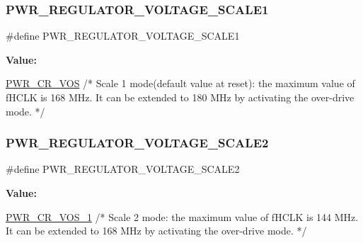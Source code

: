 \subsubsection{\texorpdfstring{P\+W\+R\+\_\+\+R\+E\+G\+U\+L\+A\+T\+O\+R\+\_\+\+V\+O\+L\+T\+A\+G\+E\+\_\+\+S\+C\+A\+L\+E1}{PWR\_REGULATOR\_VOLTAGE\_SCALE1}}
{\footnotesize\ttfamily \#define P\+W\+R\+\_\+\+R\+E\+G\+U\+L\+A\+T\+O\+R\+\_\+\+V\+O\+L\+T\+A\+G\+E\+\_\+\+S\+C\+A\+L\+E1}

{\bfseries Value\+:}
\begin{DoxyCode}
\hyperlink{group___peripheral___registers___bits___definition_gaccc33f1ba4e374e116ffa50f3a503030}{PWR\_CR\_VOS}             \textcolor{comment}{/* Scale 1 mode(default value at reset): the maximum value of fHCLK is 168
       MHz. It can be extended to}
\textcolor{comment}{                                                                       180 MHz by activating the over-drive
       mode. */}
\end{DoxyCode}
\mbox{\label{group___p_w_r_ex___regulator___voltage___scale_gaa0d38e304a0adfdbb58a61c96bdb95e9}} 
\subsubsection{\texorpdfstring{P\+W\+R\+\_\+\+R\+E\+G\+U\+L\+A\+T\+O\+R\+\_\+\+V\+O\+L\+T\+A\+G\+E\+\_\+\+S\+C\+A\+L\+E2}{PWR\_REGULATOR\_VOLTAGE\_SCALE2}}
{\footnotesize\ttfamily \#define P\+W\+R\+\_\+\+R\+E\+G\+U\+L\+A\+T\+O\+R\+\_\+\+V\+O\+L\+T\+A\+G\+E\+\_\+\+S\+C\+A\+L\+E2}

{\bfseries Value\+:}
\begin{DoxyCode}
\hyperlink{group___peripheral___registers___bits___definition_gac3093c26b256c965cebec3b2e388a3b4}{PWR\_CR\_VOS\_1}           \textcolor{comment}{/* Scale 2 mode: the maximum value of fHCLK is 144 MHz. It can be
       extended to}
\textcolor{comment}{                                                                       168 MHz by activating the over-drive
       mode. */}
\end{DoxyCode}
